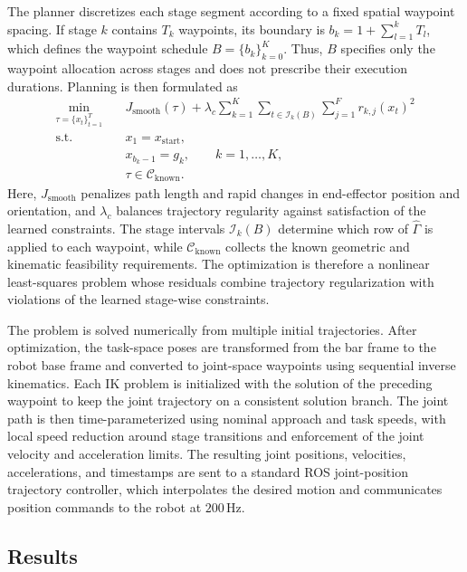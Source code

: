 The planner discretizes each stage segment according to a fixed spatial waypoint spacing. If stage $k$ contains $T_k$ waypoints, its boundary is $b_k=1+\sum_{l=1}^{k}T_l$, which defines the waypoint schedule $B=\{b_k\}_{k=0}^{K}$. Thus, $B$ specifies only the waypoint allocation across stages and does not prescribe their execution durations. Planning is then formulated as
\begin{equation}
\begin{aligned}
\min_{\tau=\{x_t\}_{t=1}^{T}}\quad
& J_{\mathrm{smooth}}(\tau)
+\lambda_c\sum_{k=1}^{K}\sum_{t\in\mathcal{I}_k(B)}\sum_{j=1}^{F}r_{k,j}(x_t)^2 \\
\mathrm{s.t.}\quad
& x_1=x_{\mathrm{start}},\\
& x_{b_k-1}=g_k, \qquad k=1,\dots,K,\\
& \tau\in\mathcal{C}_{\mathrm{known}}.
\end{aligned}
\label{eq:barclear_trajectory_optimization}
\end{equation}
Here, $J_{\mathrm{smooth}}$ penalizes path length and rapid changes in end-effector position and orientation, and $\lambda_c$ balances trajectory regularity against satisfaction of the learned constraints. The stage intervals $\mathcal{I}_k(B)$ determine which row of $\widehat{\Gamma}$ is applied to each waypoint, while $\mathcal{C}_{\mathrm{known}}$ collects the known geometric and kinematic feasibility requirements. The optimization is therefore a nonlinear least-squares problem whose residuals combine trajectory regularization with violations of the learned stage-wise constraints.

The problem is solved numerically from multiple initial trajectories. After optimization, the task-space poses are transformed from the bar frame to the robot base frame and converted to joint-space waypoints using sequential inverse kinematics. Each IK problem is initialized with the solution of the preceding waypoint to keep the joint trajectory on a consistent solution branch. The joint path is then time-parameterized using nominal approach and task speeds, with local speed reduction around stage transitions and enforcement of the joint velocity and acceleration limits. The resulting joint positions, velocities, accelerations, and timestamps are sent to a standard ROS joint-position trajectory controller, which interpolates the desired motion and communicates position commands to the robot at $200\,\mathrm{Hz}$.

\subsection{Results}

